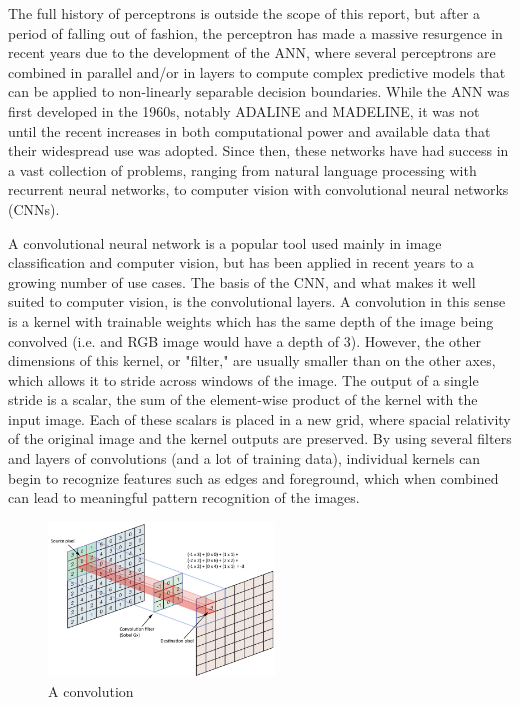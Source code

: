 \documentclass[letterpaper]{article}
\begin{document}
The full history of perceptrons is outside the scope of this report, but after a period of falling out of fashion, the perceptron has made a massive resurgence in recent years due to the development of the ANN, where several perceptrons are combined in parallel and/or in layers to compute complex 
predictive models that can be applied to non-linearly separable decision boundaries. While the ANN was first developed in the 1960s, notably 
ADALINE and MADELINE\cite{widrow_hoff_1960}, it was not until the recent increases in both computational power and available data that their 
widespread use was adopted. Since then, these networks have had success in a vast collection of problems, ranging from natural language processing 
with recurrent neural networks, to computer vision with convolutional neural networks (CNNs).  
\par
A convolutional neural network is a popular tool used mainly in image classification and computer vision, but has been applied in recent years to a 
growing number of use cases. The basis of the CNN, and what makes it well suited to computer vision, is the convolutional layers. A convolution in this 
sense is a kernel with trainable weights which has the same depth of the image being convolved (i.e. and RGB image would have a depth of 3). However, 
the other dimensions of this kernel, or "filter," are usually smaller than on the other axes, which allows it to stride across windows of the image. The output 
of a single stride is a scalar, the sum of the element-wise product of the kernel with the input image. Each of these scalars is placed in a new grid, where
spacial relativity of the original image and the kernel outputs are preserved. By using several filters and layers of convolutions (and a lot of training data),
individual kernels can begin to recognize features such as edges and foreground, which when combined can lead to meaningful pattern recognition of the 
images.
\begin{figure}[H]
	\centering
	\includegraphics[width=6cm]{convolution.png}
	\caption{A convolution \cite{pjreddie}}
\end{figure}
\end{document}

